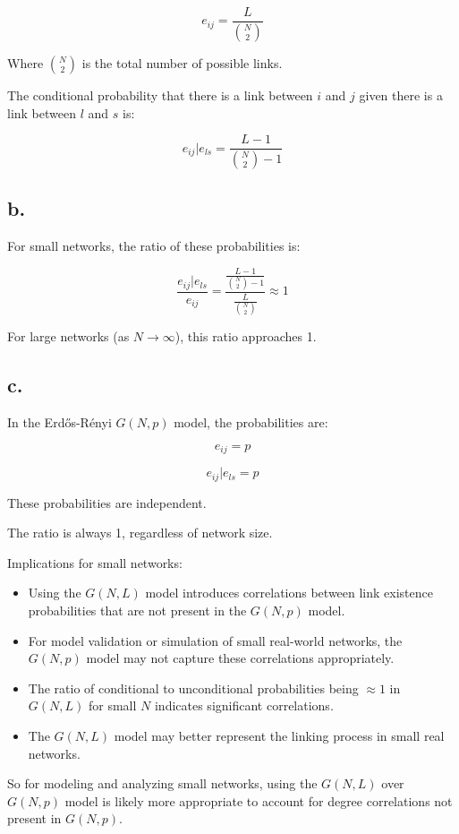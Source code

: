 \documentclass{article}
\begin{document}
$$ e_{ij} = \frac{L}{\binom{N}{2}} $$

Where $\binom{N}{2}$ is the total number of possible links.

The conditional probability that there is a link between $i$ and $j$ given there is a link between $l$ and $s$ is:

$$ e_{ij}|e_{ls} = \frac{L-1}{\binom{N}{2}-1} $$

\subsection*{b.}
For small networks, the ratio of these probabilities is:

$$ \frac{e_{ij}|e_{ls}}{e_{ij}} = \frac{\frac{L-1}{\binom{N}{2}-1}}{\frac{L}{\binom{N}{2}}} \approx 1 $$

For large networks (as $N \to \infty$), this ratio approaches 1.

\subsection*{c.}
In the Erdős-Rényi $G(N,p)$ model, the probabilities are:

$$ e_{ij} = p $$

$$ e_{ij}|e_{ls} = p $$

These probabilities are independent.

The ratio is always 1, regardless of network size.

Implications for small networks:

\begin{itemize}
    \item Using the $G(N,L)$ model introduces correlations between link existence probabilities that are not present in the $G(N,p)$ model.
    \item For model validation or simulation of small real-world networks, the $G(N,p)$ model may not capture these correlations appropriately.
    \item The ratio of conditional to unconditional probabilities being $\approx 1$ in $G(N,L)$ for small $N$ indicates significant correlations.
    \item The $G(N,L)$ model may better represent the linking process in small real networks.
\end{itemize}

So for modeling and analyzing small networks, using the $G(N,L)$ over $G(N,p)$ model is likely more appropriate to account for degree correlations not present in $G(N,p)$.
\end{document}

